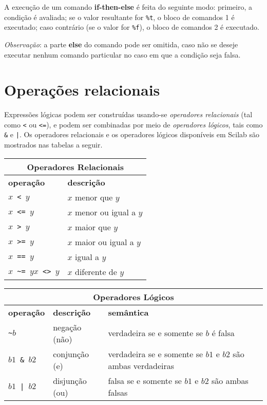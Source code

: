 \documentclass[11pt,fleqn]{practice}
\begin{document}
A execução de um comando \textbf{if-then-else} é feita do seguinte modo:
primeiro, a condição é avaliada; se o valor resultante for \texttt{\%t},
o bloco de comandos 1 é executado; caso contrário (se o valor for
\texttt{\%f}), o bloco de comandos 2 é executado.

\emph{Observação\/}: a parte \textbf{else} do comando pode ser omitida,
caso não se deseje executar nenhum comando particular no caso em que a
condição seja falsa.

\section{Operações relacionais}


Expressões lógicas podem ser construídas usando-se \emph{operadores
  relacionais\/} (tal como \texttt{<} ou \texttt{<=}), e podem ser
combinadas por meio de \emph{operadores lógicos\/}, tais como
\texttt{\&} e \texttt{|}. Os operadores relacionais e os operadores
lógicos disponíveis em Scilab são mostrados nas tabelas a seguir.

\begin{center}
  \begin{tabular}{p{2cm}l} \hline
    \multicolumn{2}{c}{\textbf{Operadores Relacionais}} \\\hline
    \textbf{operação} & \textbf{descrição} \\\hline
    \texttt{$x$ < $y$}      & $x$ menor que $y$ \\\hline
    \texttt{$x$ <= $y$}    & $x$ menor ou igual a $y$ \\\hline
    \texttt{$x$ > $y$}      & $x$ maior que $y$ \\\hline
    \texttt{$x$ >= $y$}    & $x$ maior ou igual a $y$ \\\hline
    \texttt{$x$ == $y$}    & $x$ igual a $y$ \\\hline
    \texttt{$x$ \textasciitilde= $y$}\newline \texttt{$x$ <> $y$}  & $x$ diferente de $y$ \\\hline
  \end{tabular}
\end{center}

\begin{center}
  \begin{tabular}{p{2cm}ll} \hline
    \multicolumn{3}{c}{\textbf{Operadores Lógicos}}                                                                  \\\hline
    \textbf{operação}            & \textbf{descrição} & \textbf{semântica}                                           \\\hline
    \texttt{\textasciitilde $b$} & negação (não)      & verdadeira se e somente se $b$ é falsa                       \\\hline
    \texttt{$b1$ \& $b2$}        & conjunção (e)      & verdadeira se e somente se $b1$ e $b2$ são ambas verdadeiras \\\hline  
    \texttt{$b1$ | $b2$}         & disjunção (ou)     & falsa se e somente se $b1$ e $b2$ são ambas falsas           \\\hline
  \end{tabular}
\end{center}
\end{document}
